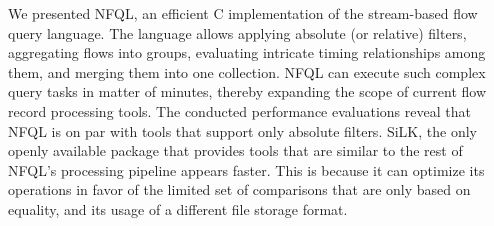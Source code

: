 We presented \ac{NFQL}, an efficient C implementation of the stream-based flow
query language. The language allows applying absolute (or relative) filters,
aggregating flows into groups, evaluating intricate timing relationships among
them, and merging them into one collection. \ac{NFQL} can execute such complex
query tasks in matter of minutes, thereby expanding the scope of current flow
record processing tools. The conducted performance evaluations reveal that
\ac{NFQL} is on par with tools that support only absolute filters. SiLK, the
only openly available package that provides tools that are similar to the rest
of \ac{NFQL}'s processing pipeline appears faster. This is because it can
optimize its operations in favor of the limited set of comparisons that are
only based on equality, and its usage of a different file storage format.
